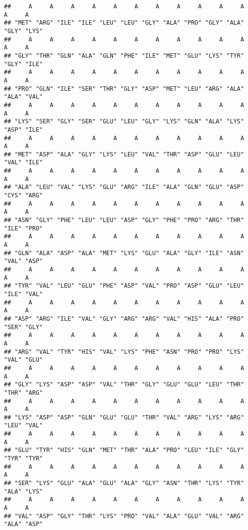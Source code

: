\documentclass[
]{article}
\begin{document}
\begin{verbatim}
##     A     A     A     A     A     A     A     A     A     A     A     A     A 
## "MET" "ARG" "ILE" "ILE" "LEU" "LEU" "GLY" "ALA" "PRO" "GLY" "ALA" "GLY" "LYS" 
##     A     A     A     A     A     A     A     A     A     A     A     A     A 
## "GLY" "THR" "GLN" "ALA" "GLN" "PHE" "ILE" "MET" "GLU" "LYS" "TYR" "GLY" "ILE" 
##     A     A     A     A     A     A     A     A     A     A     A     A     A 
## "PRO" "GLN" "ILE" "SER" "THR" "GLY" "ASP" "MET" "LEU" "ARG" "ALA" "ALA" "VAL" 
##     A     A     A     A     A     A     A     A     A     A     A     A     A 
## "LYS" "SER" "GLY" "SER" "GLU" "LEU" "GLY" "LYS" "GLN" "ALA" "LYS" "ASP" "ILE" 
##     A     A     A     A     A     A     A     A     A     A     A     A     A 
## "MET" "ASP" "ALA" "GLY" "LYS" "LEU" "VAL" "THR" "ASP" "GLU" "LEU" "VAL" "ILE" 
##     A     A     A     A     A     A     A     A     A     A     A     A     A 
## "ALA" "LEU" "VAL" "LYS" "GLU" "ARG" "ILE" "ALA" "GLN" "GLU" "ASP" "CYS" "ARG" 
##     A     A     A     A     A     A     A     A     A     A     A     A     A 
## "ASN" "GLY" "PHE" "LEU" "LEU" "ASP" "GLY" "PHE" "PRO" "ARG" "THR" "ILE" "PRO" 
##     A     A     A     A     A     A     A     A     A     A     A     A     A 
## "GLN" "ALA" "ASP" "ALA" "MET" "LYS" "GLU" "ALA" "GLY" "ILE" "ASN" "VAL" "ASP" 
##     A     A     A     A     A     A     A     A     A     A     A     A     A 
## "TYR" "VAL" "LEU" "GLU" "PHE" "ASP" "VAL" "PRO" "ASP" "GLU" "LEU" "ILE" "VAL" 
##     A     A     A     A     A     A     A     A     A     A     A     A     A 
## "ASP" "ARG" "ILE" "VAL" "GLY" "ARG" "ARG" "VAL" "HIS" "ALA" "PRO" "SER" "GLY" 
##     A     A     A     A     A     A     A     A     A     A     A     A     A 
## "ARG" "VAL" "TYR" "HIS" "VAL" "LYS" "PHE" "ASN" "PRO" "PRO" "LYS" "VAL" "GLU" 
##     A     A     A     A     A     A     A     A     A     A     A     A     A 
## "GLY" "LYS" "ASP" "ASP" "VAL" "THR" "GLY" "GLU" "GLU" "LEU" "THR" "THR" "ARG" 
##     A     A     A     A     A     A     A     A     A     A     A     A     A 
## "LYS" "ASP" "ASP" "GLN" "GLU" "GLU" "THR" "VAL" "ARG" "LYS" "ARG" "LEU" "VAL" 
##     A     A     A     A     A     A     A     A     A     A     A     A     A 
## "GLU" "TYR" "HIS" "GLN" "MET" "THR" "ALA" "PRO" "LEU" "ILE" "GLY" "TYR" "TYR" 
##     A     A     A     A     A     A     A     A     A     A     A     A     A 
## "SER" "LYS" "GLU" "ALA" "GLU" "ALA" "GLY" "ASN" "THR" "LYS" "TYR" "ALA" "LYS" 
##     A     A     A     A     A     A     A     A     A     A     A     A     A 
## "VAL" "ASP" "GLY" "THR" "LYS" "PRO" "VAL" "ALA" "GLU" "VAL" "ARG" "ALA" "ASP" 

\end{verbatim}
\end{document}
